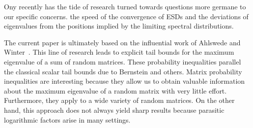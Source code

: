 \documentclass[11pt,letterpaper,twoside,reqno,nosumlimits]{amsart}
\theoremstyle{remark}
\numberwithin{equation}{section}
\numberwithin{thm}{section}
\numberwithin{prop}{section}
\numberwithin{defn}{section}
\numberwithin{remark}{section}
\begin{document}
Ony recently has the tide of research turned towards questions more germane to our specific concerns. the speed of the convergence of ESDs and the deviations of eigenvalues from the positions implied by the limiting spectral distributions.

The current paper is ultimately based on the influential work of Ahlswede and Winter~\cite{AW02}. This line of  research leads to explicit tail bounds for the maximum eigenvalue of a sum of random matrices. These probability inequalities parallel the classical scalar tail bounds due to Bernstein and others. Matrix probability inequalities are interesting because they allow us to obtain valuable information about the maximum eigenvalue of a random matrix with very little effort. Furthermore, they apply to a wide variety of random matrices. On the other hand, this approach does not always yield sharp results because parasitic logarithmic factors arise in many settings.



\end{document}
